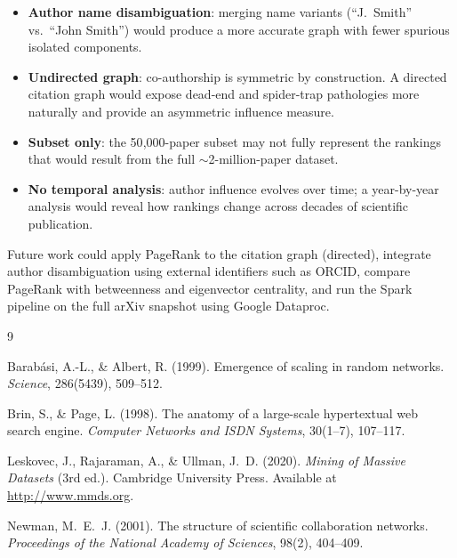 \documentclass[12pt, a4paper]{article}
\begin{document}
\begin{itemize}
  \item \textbf{Author name disambiguation}: merging name variants (``J.\ Smith'' vs.\ ``John Smith'') would produce a more accurate graph with fewer spurious isolated components.
  \item \textbf{Undirected graph}: co-authorship is symmetric by construction. A directed citation graph would expose dead-end and spider-trap pathologies more naturally and provide an asymmetric influence measure.
  \item \textbf{Subset only}: the 50{,}000-paper subset may not fully represent the rankings that would result from the full $\sim$2-million-paper dataset.
  \item \textbf{No temporal analysis}: author influence evolves over time; a year-by-year analysis would reveal how rankings change across decades of scientific publication.
\end{itemize}

Future work could apply PageRank to the citation graph (directed), integrate author disambiguation using external identifiers such as ORCID, compare PageRank with betweenness and eigenvector centrality, and run the Spark pipeline on the full arXiv snapshot using Google Dataproc.

\begin{thebibliography}{9}

Barab\'{a}si, A.-L., \& Albert, R. (1999).
Emergence of scaling in random networks.
\textit{Science}, 286(5439), 509--512.

Brin, S., \& Page, L. (1998).
The anatomy of a large-scale hypertextual web search engine.
\textit{Computer Networks and ISDN Systems}, 30(1--7), 107--117.

Leskovec, J., Rajaraman, A., \& Ullman, J.~D. (2020).
\textit{Mining of Massive Datasets} (3rd ed.).
Cambridge University Press.
Available at \url{http://www.mmds.org}.

Newman, M.~E.~J. (2001).
The structure of scientific collaboration networks.
\textit{Proceedings of the National Academy of Sciences}, 98(2), 404--409.

\end{thebibliography}
\end{document}
